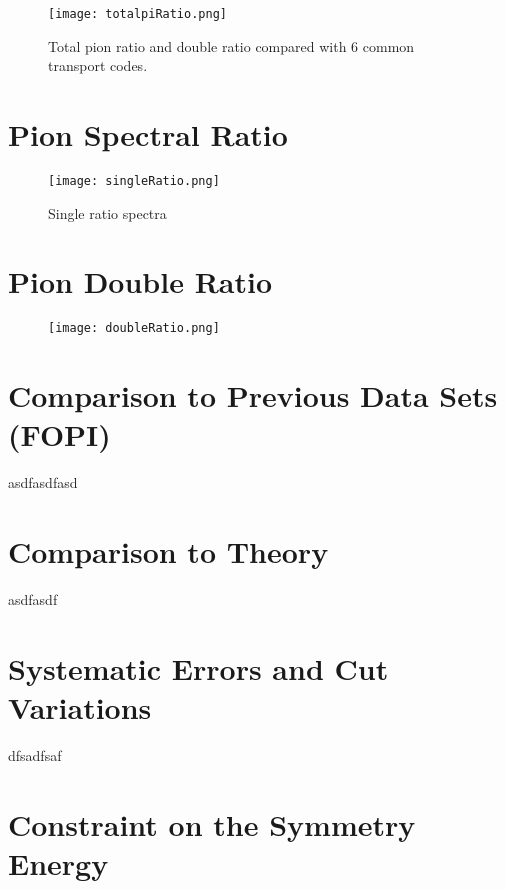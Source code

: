 \begin{figure}[!htb]
\centering
\texttt{[image: totalpiRatio.png]}
\caption{Total pion ratio and double ratio compared with 6 common transport codes.}
\label{fig:totalpiRatio}
\end{figure}



\section{Pion Spectral Ratio}


\begin{figure}
\centering
\texttt{[image: singleRatio.png]}
\caption{Single ratio spectra}
\label{fig:SRspectra}
\end{figure}


\section{Pion Double Ratio}

\begin{figure}[!htb]
\centering
\texttt{[image: doubleRatio.png]}
\caption{}
\label{fig:spectraDR}
\end{figure}




\section{Comparison to Previous Data Sets (FOPI)}
asdfasdfasd
\section{Comparison to Theory}
asdfasdf

\section{Systematic Errors and Cut Variations}
\label{sec:cutvar}
dfsadfsaf
\section{Constraint on the Symmetry Energy}
